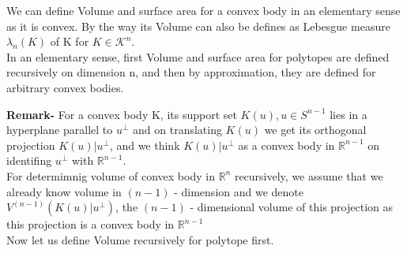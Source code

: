 \documentclass[oneside]{book}
\begin{document}
	\normalfont
	
	We can define Volume and surface area for a convex body in an elementary sense as it is convex. By the way its Volume can also be defines as Lebesgue measure $\lambda_{n}(K)$ of K  for $ K \in  \mathcal{K}^{n} $. \\
	In an elementary sense, first Volume and surface area for polytopes are defined recursively on dimension n, and then by approximation, they are defined for arbitrary convex bodies. \newline
	
	\textbf{Remark-} 
	For a convex body  K, its support set $K(u),u \in S^{n-1} $ lies in a hyperplane parallel to 
	$u^{\perp}$ and on translating $K(u)$ we get its orthogonal projection $K(u) | u^{\perp}$, and we think  $K(u) | u^{\perp}$ as a convex body in $\mathbb{R}^{n-1}$  on identifing $u^{\perp}$ with $\mathbb{R}^{n-1}$. \\
	For determimnig volume of convex body in $\mathbb{R}^{n}$ recursively, we assume that we already  know volume in $(n-1)$ - dimension and we denote $V^{(n-1)}\left(K(u) | u^{\perp}\right)$, the $(n-1)$ - dimensional volume of this projection as this projection is a convex body in $\mathbb{R}^{n-1}$ 
	\\
	Now let us define Volume recursively for polytope first. 
	
\end{document}

